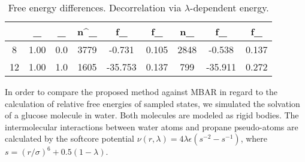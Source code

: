 \documentclass[journal=jctcce,manuscript=article,layout=twocolumn]{achemso}
\begin{document}
\begin{table*}
	\caption{Free energy differences. Decorrelation via $\lambda$-dependent energy.}
	\label{table:glucose vdW free energies}
	\begin{tabular}{CCCCCCCCC}
		\hline
		 & \lambda_ & \lambda_ & n^_ & \Delta f_ &  \delta \Delta f_ & n_ & \Delta f_ & \delta \Delta f_ \\
		\hline
		8 & 1.00 & 0.0 & 3779 & -0.731 & 0.105 & 2848 & -0.538 & 0.137 \\
		12 & 1.00 & 1.0 & 1605 & -35.753 & 0.137 & 799 & -35.911 & 0.272 \\
		\hline
	\end{tabular}
\end{table*}





In order to compare the proposed method against MBAR in regard to the calculation of relative free energies of sampled states, we simulated the solvation of a glucose molecule in water. Both molecules are modeled as rigid bodies. The intermolecular interactions between water atoms and propane pseudo-atoms are calculated by the softcore potential\cite{Beutler_1994} $\nu(r,\lambda) = 4\lambda\epsilon(s^{-2} - s^{-1})$, where $s = (r/\sigma)^6 + 0.5 (1-\lambda)$.
\end{document}
